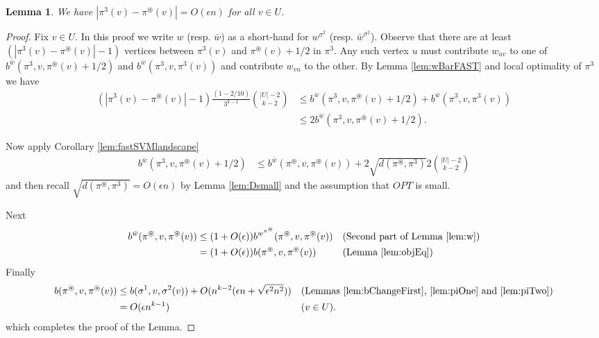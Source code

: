 \documentclass[dvips,11pt,letter]{article}
\newtheorem{lemma}[theorem]{Lemma}
\begin{document}
\begin{lemma}\label{lem:23close}
We have
$|\pi^3(v) - \pi^\circledast(v)| = O(\epsilon n)$ for all $v \in U$.
\end{lemma}
\begin{proof}
Fix $v \in U$. In this proof we write $w$ (resp. $\bar w$) as a short-hand for $w^{\sigma^2}$ (resp. $\bar w^{\sigma^2}$). Observe that there are at least $(|\pi^3(v) - \pi^\circledast(v)|-1)$ vertices between $\pi^3(v)$ and $\pi^\circledast(v) + 1/2$ in $\pi^3$. Any such vertex $u$ must contribute $w_{uv}$ to one of $b^{\bar w}(\pi^3, v, \pi^\circledast(v)+ 1/2)$ and $b^{\bar w}(\pi^3,v,\pi^3(v))$ and contribute $w_{vu}$ to the other.
By Lemma \ref{lem:wBarFAST} and local optimality of $\pi^3$ we have
\begin{align*}
(|\pi^3(v) - \pi^\circledast(v)|-1)\frac{(1-2/10)}{3^{k-1}} \binom{|U|-2}{k-2} &\le b^{\bar w}(\pi^3, v, \pi^\circledast(v)+ 1/2) + b^{\bar w}(\pi^3,v,\pi^3(v)) \\
& \le 2b^{\bar w}(\pi^3, v, \pi^\circledast(v)+ 1/2)
.\end{align*}

Now apply Corollary \ref{lem:fastSVMlandscape}
\begin{align*}
b^{\bar w}(\pi^3, v, \pi^\circledast(v)+ 1/2) &\le b^{\bar w}(\pi^\circledast, v, \pi^\circledast(v)) + 2 \sqrt{d(\pi^\circledast, \pi^3)} 2 \binom{|U|-2}{k-2}
\end{align*}
and then recall $\sqrt{d(\pi^\circledast, \pi^3)}=O(\epsilon n)$ by Lemma \ref{lem:Dsmall} and the assumption that $OPT$ is small.

Next
\begin{align}
b^{\bar w}(\pi^\circledast, v, \pi^\circledast(v)) 
&\le (1+O(\epsilon)) b^{w^{\pi^{\circledast}}}(\pi^\circledast, v, \pi^\circledast(v)) && \text{(Second part of Lemma \ref{lem:w})} \notag \\
& = (1+O(\epsilon))b(\pi^\circledast, v, \pi^\circledast(v)) && \text{(Lemma \ref{lem:objEq})} \label{eqn:hello}
\end{align}
Finally
\begin{align*}
b(\pi^\circledast, v, \pi^\circledast(v)) &\le b(\sigma^1, v, \sigma^2(v)) + O(n^{k-2}(\epsilon n + \sqrt{\epsilon^2 n^2})) && \text{(Lemmas \ref{lem:bChangeFirst}, \ref{lem:piOne} and \ref{lem:piTwo})} \\
&= O(\epsilon n^{k-1}) && \text{($v \in U$)}
.\end{align*}
which completes the proof of the Lemma.
\end{proof}
\end{document}
